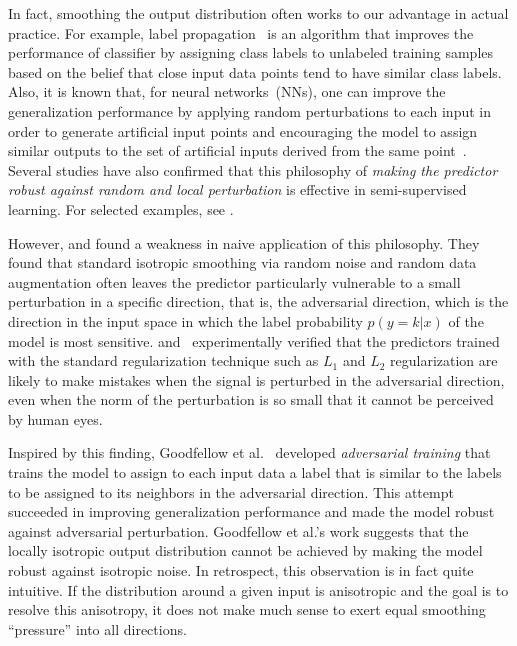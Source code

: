 \documentclass[10pt,journal,compsoc]{IEEEtran}
\begin{document}
In fact, smoothing the output distribution often works to our advantage in actual practice.
For example, label propagation~\cite{zhu2002learning} is an algorithm that improves the performance of classifier by assigning class labels to unlabeled training samples based on the belief that close input data points tend to have similar class labels. 
Also, it is known that, for neural networks~(NNs), one can improve the generalization performance by applying random perturbations to each input in order to generate artificial input points and encouraging the model to assign similar outputs to the set of artificial inputs derived from the same point~\cite{bishop1995training}.
Several studies have also confirmed that this philosophy of \textit{making the predictor robust against random and local perturbation} is effective in semi-supervised learning. 
For selected examples, see \cite{wager2013dropout,bachman2014learning,rasmus2015semi, sajjadi2016regularization,laine2016temporal}.

However, \cite{szegedy2013intriguing} and \cite{goodfellow2014explaining} found a weakness in naive application of this philosophy. 
They found that standard isotropic smoothing via random noise and random data augmentation often leaves the predictor particularly vulnerable to a small perturbation in a specific direction, that is, the adversarial direction, which is the direction in the input space in which the label probability $p(y=k|x)$ of the model is most sensitive.
\cite{szegedy2013intriguing} and~\cite{goodfellow2014explaining}  experimentally verified that the predictors trained with the standard regularization technique such as $L_1$ and $L_2$ regularization are likely to make mistakes when the signal is perturbed in the adversarial direction, even when the norm of the perturbation is so small that it cannot be perceived by human eyes. 

Inspired by this finding, Goodfellow et al.~\cite{goodfellow2014explaining} developed \textit{adversarial training} that trains the model to assign to each input data a label that is similar to the labels to be assigned to its neighbors in the adversarial direction. 
This attempt succeeded in improving generalization performance and made the model robust against adversarial perturbation. 
Goodfellow et al.'s work suggests that the locally isotropic output distribution cannot be achieved by making the model robust against isotropic noise.
In retrospect, this observation is in fact quite intuitive.
If the distribution around a given input is anisotropic and the goal is to resolve this anisotropy, it does not make much sense to exert equal smoothing ``pressure'' into all directions.
\end{document}
